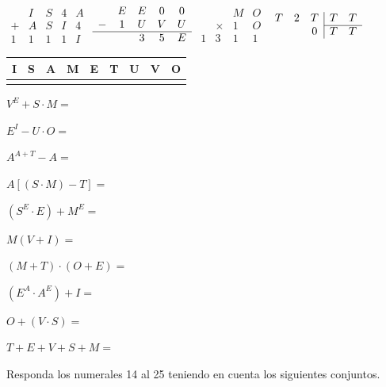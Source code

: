 \documentclass[10pt,twoside]{article}
\begin{document}
\begin{enumerate}
$ \begin{array}{ccccc}
  & I & S & 4 & A \\ 
+ & A & S & I & 4 \\ \hline 
1 & 1 & 1 & 1 & I
 \end{array} $ \hspace*{.5cm}
  $\begin{array}{ccccc}
 & E & E & 0 & 0 \\ 
- & 1 & U & V & U \\ \hline
 &  & 3 & 5 & E
 \end{array} $ \hspace*{.4cm}
 $\begin{array}{cccc}
  &  & M & O \\ 
 & \times & 1 & O \\ \hline
1 & 3 & 1 & 1
 \end{array} $ \hspace*{.5cm}
 $\begin{array}{ccc|cc}
 T & 2 & T & T & T \\ \cline{4-5}
  &  & 0 & T & T
 \end{array} $
\begin{center}
 \begin{tabular}{|c|c|c|c|c|c|c|c|c|}
 \hline 
 I & S & A & M & E & T & U & V & O \\ 
 \hline 
 &  &  &  &  &  &  &  &  \\ 
 \hline 
 \end{tabular} 
\end{center}
 \begin{multicols}{2}
 \item $V^{E}+S\cdot M=$
 \item $E^{I}-U\cdot O=$
 \item $A^{A+T}-A=$
 \item $A[(S\cdot M)-T]=$
 \item $(S^{E}\cdot E)+M^{E}=$
 \item $M(V+I)=$
 \item $(M+T)\cdot (O+E)=$
 \item $(E^{A}\cdot A^{E})+I=$
 \item $O+(V\cdot S)=$
 \item $T+E+V+S+M=$
 \end{multicols}
Responda los numerales 14 al 25 teniendo en cuenta los siguientes conjuntos.


\end{enumerate}
\end{document}
